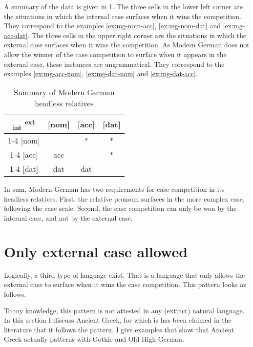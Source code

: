 A summary of the data is given in \ref{tbl:summary-modern-german}.
The three cells in the lower left corner are the situations in which the internal case surfaces when it wins the competition. They correspond to the examples \ref{ex:mg-nom-acc}, \ref{ex:mg-nom-dat} and \ref{ex:mg-acc-dat}.
The three cells in the upper right corner are the situations in which the external case surfaces when it wins the competition. As Modern German does not allow the winner of the case competition to surface when it appears in the external case, these instances are ungrammatical. They correspond to the examples \ref{ex:mg-acc-nom}, \ref{ex:mg-dat-nom} and \ref{ex:mg-dat-acc}.

\begin{table}[ht]
  \center
  \caption{Summary of Modern German headless relatives}
  \begin{tabular}{c|c|c|c}
    \toprule
   \textsubscript{\ac{int}} \textsuperscript{\ac{ext}}
          & [\ac{nom}]
          & [\ac{acc}]
          & [\ac{dat}]
          \\ \cmidrule{1-4}
      [\ac{nom}]
          &
          & *
          & *
          \\ \cmidrule{1-4}
      [\ac{acc}]
          & \ac{acc}
          &
          & *
          \\ \cmidrule{1-4}
      [\ac{dat}]
          & \ac{dat}
          & \ac{dat}
          &
          \\
    \bottomrule
  \end{tabular}
  \label{tbl:summary-modern-german}
\end{table}

In sum, Modern German has two requirements for case competition in its headless relatives. First, the relative pronoun surfaces in the more complex case, following the case scale. Second, the case competition can only be won by the internal case, and not by the external case.

\section{Only external case allowed}\label{sec:pattern-iii}

Logically, a third type of language exist. That is a language that only allows the external case to surface when it wins the case competition. This pattern looks as follows.

To my knowledge, this pattern is not attested in any (extinct) natural language. In this section I discuss Ancient Greek, for which is has been claimed in the literature that it follows the pattern. I give examples that show that Ancient Greek actually patterns with Gothic and Old High German.

